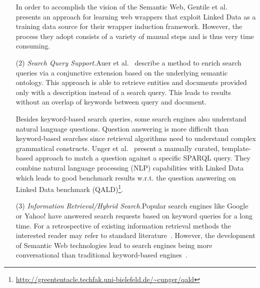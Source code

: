\begin{itemize}
In order to accomplish the vision of the Semantic Web, Gentile et al.~\cite{Gentile2013} presents an approach for learning web wrappers that exploit Linked Data as a training data source for their wrapper induction framework. 
However, the process they adopt consists of a variety of manual steps and is thus very time consuming.


\item[(2)]
\emph{Search Query Support.}Auer et al.~\cite{conjunctiveQueries} describe a method to enrich search queries via a conjunctive extension based on the underlying semantic ontology. This approach is able to retrieve entities and documents provided only with a description instead of a search query. 
This leads to results without an overlap of keywords between query and document.

Besides keyword-based search queries, some search engines also understand natural language questions. 
Question answering is more difficult than keyword-based searches since retrieval algorithms need to understand complex grammatical constructs.
Unger et al.~\cite{template} present a manually curated, template-based approach to match a question against a specific SPARQL query. 
They combine natural language processing (NLP) capabilities with Linked Data which leads to good benchmark results w.r.t. the question answering on Linked Data benchmark (QALD)\footnote{\url{http://greententacle.techfak.uni-bielefeld.de/~cunger/qald}}.

\item[(3)]
\emph{Information Retrieval/Hybrid Search.}Popular search engines like Google or Yahoo! have answered search requests based on keyword queries for a long time. 
For a retrospective of existing information retrieval methods the interested reader may refer to standard literature~\cite{IRBook}.
However, the development of Semantic Web technologies lead to search engines being more conversational than traditional keyword-based engines~\cite{googleKeynote}.


\end{itemize}
